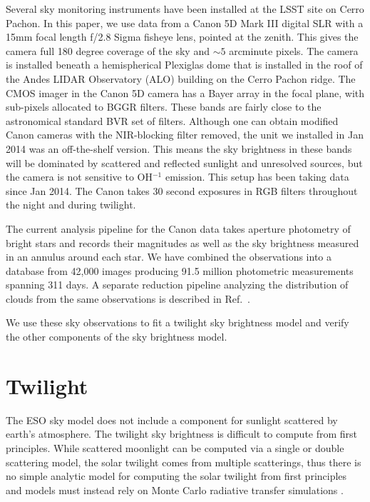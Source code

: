 \documentclass[]{spie}
\begin{document}
Several sky monitoring instruments have been installed at the LSST site on Cerro Pachon.  In this paper, we use data from a Canon 5D Mark III digital SLR with a 15mm focal length f/2.8 Sigma fisheye lens, pointed at the zenith. This gives the camera full 180 degree coverage of the sky and $\sim5$ arcminute pixels. The camera is installed beneath a hemispherical Plexiglas dome that is installed in the roof of the Andes LIDAR Observatory (ALO) building on the Cerro Pachon ridge.  The CMOS imager in the Canon 5D camera has a Bayer array in the focal plane, with sub-pixels allocated to BGGR filters.  These bands are fairly close to the astronomical standard BVR set of filters. Although one can obtain modified Canon cameras with the NIR-blocking filter removed, the unit we installed in Jan 2014 was an off-the-shelf version. This means the sky brightness in these bands will be dominated by scattered and reflected sunlight and unresolved sources, but the camera is not sensitive to OH$^{-1}$ emission.  This setup has been taking data since Jan 2014.  The Canon takes 30 second exposures in RGB filters throughout the night and during twilight. 

The current analysis pipeline for the Canon data takes aperture photometry of bright stars and records their magnitudes as well as the sky brightness measured in an annulus around each star.  We have combined the observations into a database from 42,000 images producing 91.5 million photometric measurements spanning 311 days.  A separate reduction pipeline analyzing the distribution of clouds from the same observations is described in Ref.~.

We use these sky observations to fit a twilight sky brightness model and verify the other components of the sky brightness model.

\section{Twilight}\label{sec:twi}

The ESO sky model does not include a component for sunlight scattered by earth's atmosphere.  The twilight sky brightness is difficult to compute from first principles.  While scattered moonlight can be computed via a single or double scattering model, the solar twilight comes from multiple scatterings, thus there is no simple analytic model for computing the solar twilight from first principles and models must instead rely on Monte Carlo radiative transfer simulations \cite{Patat06}.
\end{document}
